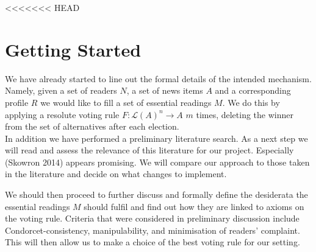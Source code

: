 \documentclass[10pt,a4paper,english]{article}
\begin{document}
<<<<<<< HEAD
\section{Getting Started}

We have already started to line out the formal details of the intended mechanism. Namely, given a set of readers $N$, a set of news items $A$ and a corresponding profile $R$ we would like to fill a set of essential readings $M$. We do this by applying a resolute voting rule $F:\mathcal{L}(A)^n \rightarrow A$ $m$ times, deleting the winner from the set of alternatives after each election.\\

In addition we have performed a preliminary literature search. As a next step we will read and assess the relevance of this literature for our project. Especially (Skowron 2014) appears promising. We will compare our approach to those taken in the literature and decide on what changes to implement.

We should then proceed to further discuss and formally define the desiderata the essential readings $M$ should fulfil and find out how they are linked to axioms on the voting rule. Criteria that were considered in preliminary discussion include Condorcet-consistency, manipulability, and minimisation of readers' complaint. This will then allow us to make a choice of the best voting rule for our setting.
\end{document}
